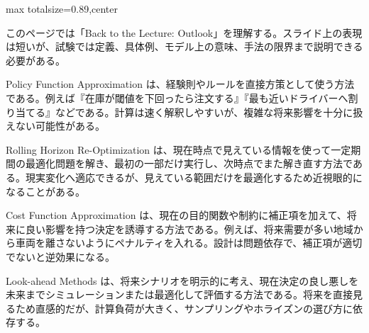 \begin{minipage}[t]{0.58\textwidth}
\begin{adjustbox}{max totalsize={\textwidth}{0.89\textheight},center}
\begin{minipage}{\textwidth}\scriptsize
{}このページでは「Back to the Lecture: Outlook」を理解する。スライド上の表現は短いが、試験では定義、具体例、モデル上の意味、手法の限界まで説明できる必要がある。\par
Policy Function Approximation は、経験則やルールを直接方策として使う方法である。例えば『在庫が閾値を下回ったら注文する』『最も近いドライバーへ割り当てる』などである。計算は速く解釈しやすいが、複雑な将来影響を十分に扱えない可能性がある。\par
Rolling Horizon Re-Optimization は、現在時点で見えている情報を使って一定期間の最適化問題を解き、最初の一部だけ実行し、次時点でまた解き直す方法である。現実変化へ適応できるが、見えている範囲だけを最適化するため近視眼的になることがある。\par
Cost Function Approximation は、現在の目的関数や制約に補正項を加えて、将来に良い影響を持つ決定を誘導する方法である。例えば、将来需要が多い地域から車両を離さないようにペナルティを入れる。設計は問題依存で、補正項が適切でないと逆効果になる。\par
Look-ahead Methods は、将来シナリオを明示的に考え、現在決定の良し悪しを未来までシミュレーションまたは最適化して評価する方法である。将来を直接見るため直感的だが、計算負荷が大きく、サンプリングやホライズンの選び方に依存する。\par

\end{minipage}
\end{adjustbox}
\end{minipage}
